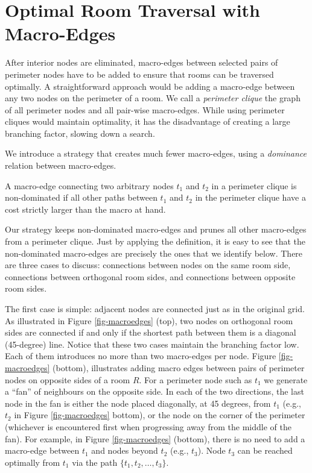 \section{Optimal Room Traversal with Macro-Edges}

After interior nodes are eliminated, 
macro-edges between selected pairs of perimeter nodes 
have to be added to ensure that rooms can be traversed optimally.
A straightforward approach would be adding a macro-edge between 
any two nodes on the perimeter of a room. 
We call a \emph{perimeter clique} the graph of all perimeter nodes and
all pair-wise macro-edges.
While using perimeter cliques would maintain optimality, it has the disadvantage
of creating a large branching factor, slowing down a search.

We introduce a strategy that creates much fewer macro-edges, 
using a \emph{dominance} relation between macro-edges.
%

\begin{definition}
A macro-edge connecting two 
arbitrary nodes $t_1$ and $t_2$ in a perimeter clique
is non-dominated if all other paths between $t_1$ and $t_2$
in the perimeter clique have a cost strictly larger than the macro at hand.
\end{definition}

Our strategy keeps non-dominated macro-edges and prunes all other macro-edges
from a perimeter clique.
Just by applying the definition, 
it is easy to see that the non-dominated macro-edges are precisely the ones that
we identify below.
There are three cases to discuss: connections between nodes
on the same room side,
connections between orthogonal room sides, 
and connections between opposite room sides.

The first case is simple: adjacent nodes are connected just as in the original grid.
As illustrated in Figure \ref{fig-macroedges} (top),
two nodes on orthogonal room sides are connected if and only if
the shortest path between them is a diagonal (45-degree) line.
Notice that these two cases maintain the branching factor low.
Each of them introduces no more than two macro-edges per node.
Figure \ref{fig-macroedges} (bottom), illustrates adding macro 
edges between pairs of perimeter nodes on opposite sides of a room $R$.
For a perimeter node such as $t_1$ we generate a ``fan'' of neighbours on the opposite side. 
In each of the two directions, the last node in the fan is either 
the node placed diagonally, at 45 degrees, from $t_1$ (e.g., $t_2$ in Figure \ref{fig-macroedges} bottom),
or the node on the corner of the perimeter (whichever is encountered first when progressing away from the
middle of the fan).
For example, in Figure \ref{fig-macroedges} (bottom), there is no need to add a macro-edge between $t_1$
and nodes beyond $t_2$ (e.g., $t_3$). Node $t_3$ can be reached optimally from $t_1$ via the path
$\lbrace t_1, t_2, \dots, t_3 \rbrace$.

